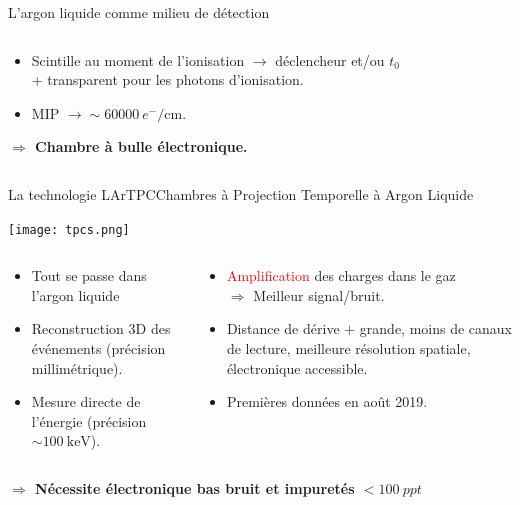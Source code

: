 \begin{frame}{L'argon liquide comme milieu de détection}
\begin{scriptsize}
\begin{columns}
\begin{column}{0.4\textwidth}
\begin{itemize}
           				\item Scintille au moment de l'ionisation $\rightarrow$ déclencheur et/ou $t_0$ \\ + transparent pour les photons  d'ionisation.
         				\item MIP $\rightarrow\sim\SI{60000}{e^-\per\centi\meter}$. \\
           			\end{itemize}
           			\begin{footnotesize}
       	    			\textbf{$\Rightarrow$ Chambre à bulle électronique.}
       	    		\end{footnotesize}
           		\end{column}
           	\end{columns}
        \end{scriptsize}
    \end{frame}
        
    \begin{frame}{La technologie LArTPC}{Chambres à Projection Temporelle à Argon Liquide}
       	\begin{scriptsize}
       			\centering\texttt{[image: tpcs.png]}\\
       			\begin{columns}
       				\begin{column}{0.5\textwidth}
       					\begin{itemize}
           					\item Tout se passe dans l'argon liquide
       						\item Reconstruction 3D des événements (précision millimétrique).
       						\item Mesure directe de l'énergie (précision $\sim\SI{100}{\kilo\electronvolt}$).
       					\end{itemize}
       				\end{column}
       				\begin{column}{0.5\textwidth}
       					\begin{itemize}
       						\item \textcolor{red}{Amplification} des charges dans le gaz\\$\Rightarrow$ Meilleur signal/bruit.
       						\item Distance de dérive $+$ grande, moins de canaux de lecture, meilleure résolution spatiale, électronique accessible.
       						\item Premières données en août 2019.
       					\end{itemize}
       				\end{column}
       			\end{columns}
       			\vfill
       			\textbf{$\Rightarrow$ Nécessite électronique bas bruit et impuretés $<\SI{100}{ppt}$}
       	\end{scriptsize}
    \end{frame}
    

